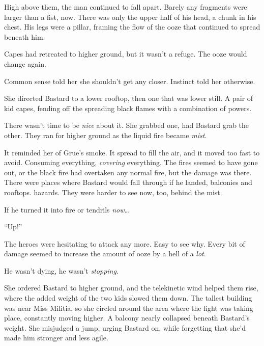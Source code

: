 High above them, the man continued to fall apart.  Barely any fragments were larger than a fist, now.  There was only the upper half of his head, a chunk in his chest.  His legs were a pillar, framing the flow of the ooze that continued to spread beneath him.



Capes had retreated to higher ground, but it wasn't a refuge.  The ooze would change again.



Common sense told her she shouldn't get any closer.  Instinct told her otherwise.



She directed Bastard to a lower rooftop, then one that was lower still.  A pair of kid capes, fending off the spreading black flames with a combination of powers.



There wasn't time to be \emph{nice} about it.  She grabbed one, had Bastard grab the other.  They ran for higher ground as the liquid fire became \emph{mist}.



It reminded her of Grue's smoke.  It spread to fill the air, and it moved too fast to avoid.  Consuming everything, \emph{covering} everything.  The fires seemed to have gone out, or the black fire had overtaken any normal fire, but the damage was there.  There were places where Bastard would fall through if he landed, balconies and rooftops.  hazards.  They were harder to see now, too, behind the mist.



If he turned it into fire or tendrils \emph{now}\ldots



``Up!''



The heroes were hesitating to attack any more.  Easy to see why.  Every bit of damage seemed to increase the amount of ooze by a hell of a \emph{lot}.



He wasn't dying, he wasn't \emph{stopping}.



She ordered Bastard to higher ground, and the telekinetic wind helped them rise, where the added weight of the two kids slowed them down.  The tallest building was near Miss Militia, so she circled around the area where the fight was taking place, constantly moving higher.  A balcony nearly collapsed beneath Bastard's weight.  She misjudged a jump, urging Bastard on, while forgetting that she'd made him stronger and less agile.



